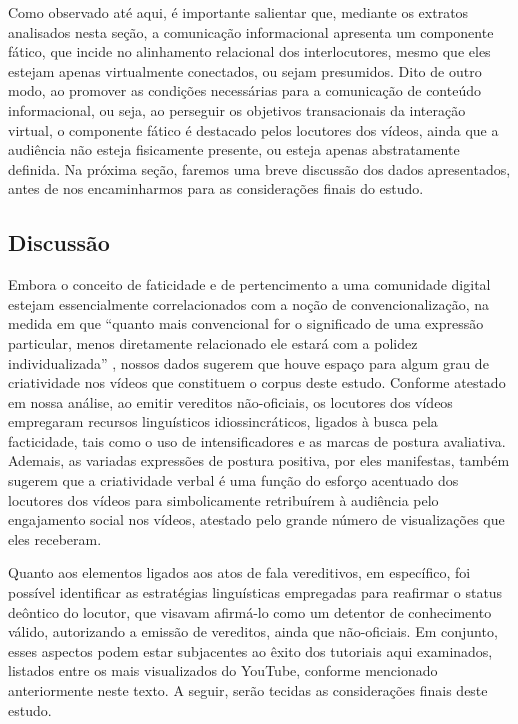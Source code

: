 \documentclass[portuguese]{textolivre}
\begin{document}
Como observado até aqui, é importante salientar que, mediante os extratos analisados nesta seção, a comunicação informacional apresenta um componente fático, que incide no alinhamento relacional dos interlocutores, mesmo que eles estejam apenas virtualmente conectados, ou sejam presumidos. Dito de outro modo, ao promover as condições necessárias para a comunicação de conteúdo informacional, ou seja, ao perseguir os objetivos transacionais da interação virtual, o componente fático é destacado pelos locutores dos vídeos, ainda que a audiência não esteja fisicamente presente, ou esteja apenas abstratamente definida.
Na próxima seção, faremos uma breve discussão dos dados apresentados, antes de nos encaminharmos para as considerações finais do estudo.


\subsection{Discussão}\label{sec-organizacao-latex}
Embora o conceito de faticidade e de pertencimento a uma comunidade digital estejam essencialmente correlacionados com a noção de convencionalização, na medida em que “quanto mais convencional for o significado de uma expressão particular, menos diretamente relacionado ele estará com a polidez individualizada” \cite[p. 176]{house1989}, nossos dados sugerem que houve espaço para algum grau de criatividade nos vídeos que constituem o corpus deste estudo. Conforme atestado em nossa análise, ao emitir vereditos não-oficiais, os locutores dos vídeos empregaram recursos linguísticos idiossincráticos, ligados à busca pela facticidade, tais como o uso de intensificadores e as marcas de postura avaliativa. Ademais, as variadas expressões de postura positiva, por eles manifestas, também sugerem que a criatividade verbal é uma função do esforço acentuado dos locutores dos vídeos para simbolicamente retribuírem à audiência pelo engajamento social nos vídeos, atestado pelo grande número de visualizações que eles receberam.

Quanto aos elementos ligados aos atos de fala vereditivos, em específico, foi possível identificar as estratégias linguísticas empregadas para reafirmar o status deôntico do locutor, que visavam afirmá-lo como um detentor de conhecimento válido, autorizando a emissão de vereditos, ainda que não-oficiais. Em conjunto, esses aspectos podem estar subjacentes ao êxito dos tutoriais aqui examinados, listados entre os mais visualizados do YouTube, conforme mencionado anteriormente neste texto. A seguir, serão tecidas as considerações finais deste estudo.
\end{document}
